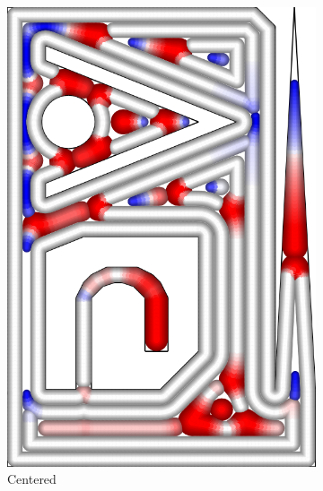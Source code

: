 \begin{figure}
\begin{subfigure}{\figwidth}
\includegraphics[height=\figheight]{sources-validation-gMAT-example-TEST-Center-widths.png}
\caption{Centered}\label{TEST_Center_accuracy}
\end{subfigure}
\begin{subfigure}{\figwidth}\centering

\end{subfigure}
\end{figure}

